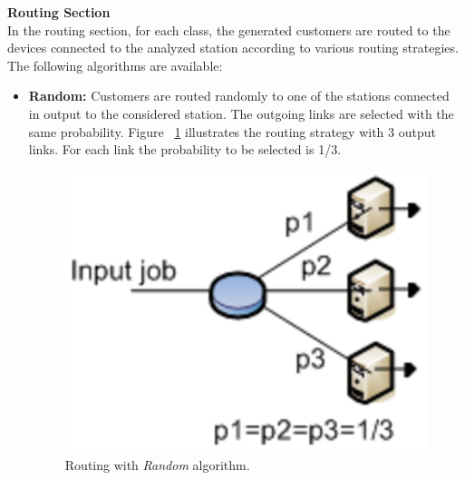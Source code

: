 \noindent \textbf{Routing Section}\\ In the routing section, for
each class, the generated customers are routed to the devices
connected to the analyzed station according to various routing
strategies. The following algorithms are available:
\begin{itemize}
\item \textbf{Random:} Customers are routed randomly to one of the
stations connected in output to the considered station. The
outgoing links are selected with the same probability. Figure
~\ref{fig:routrand} illustrates the routing strategy with 3 output
links. For each link the probability to be selected is 1/3.
\begin{figure}[htb]
    \begin{center}
        \includegraphics[scale=.5]{img/jsimg/8.7.eps}
    \end{center}
    \caption{Routing with \emph{Random} algorithm.}
    \label{fig:routrand}
\end{figure}


\end{itemize}
